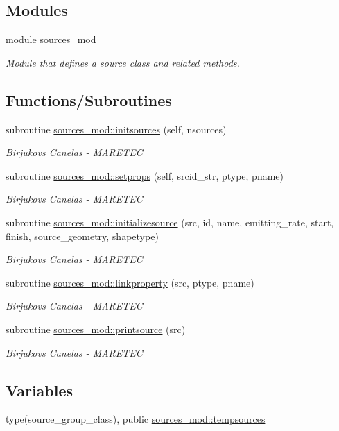 \subsection*{Modules}
\begin{DoxyCompactItemize}
\item 
module \hyperlink{namespacesources__mod}{sources\+\_\+mod}
\begin{DoxyCompactList}\small\item\em Module that defines a source class and related methods. \end{DoxyCompactList}\end{DoxyCompactItemize}
\subsection*{Functions/\+Subroutines}
\begin{DoxyCompactItemize}
\item 
subroutine \hyperlink{namespacesources__mod_a6da3303e5c39d77c0111ec50623bf5fe}{sources\+\_\+mod\+::initsources} (self, nsources)
\begin{DoxyCompactList}\small\item\em Birjukovs Canelas -\/ M\+A\+R\+E\+T\+EC \end{DoxyCompactList}\item 
subroutine \hyperlink{namespacesources__mod_aa02996b7219ce9c9d26439e8d2d0a468}{sources\+\_\+mod\+::setprops} (self, srcid\+\_\+str, ptype, pname)
\begin{DoxyCompactList}\small\item\em Birjukovs Canelas -\/ M\+A\+R\+E\+T\+EC \end{DoxyCompactList}\item 
subroutine \hyperlink{namespacesources__mod_a6dcf7a3e3ccf75e01853df166231d484}{sources\+\_\+mod\+::initializesource} (src, id, name, emitting\+\_\+rate, start, finish, source\+\_\+geometry, shapetype)
\begin{DoxyCompactList}\small\item\em Birjukovs Canelas -\/ M\+A\+R\+E\+T\+EC \end{DoxyCompactList}\item 
subroutine \hyperlink{namespacesources__mod_a683ca7e4aca7a0050aad9f506569fca9}{sources\+\_\+mod\+::linkproperty} (src, ptype, pname)
\begin{DoxyCompactList}\small\item\em Birjukovs Canelas -\/ M\+A\+R\+E\+T\+EC \end{DoxyCompactList}\item 
subroutine \hyperlink{namespacesources__mod_a641fe9ecc295e486a714c1aaa133d991}{sources\+\_\+mod\+::printsource} (src)
\begin{DoxyCompactList}\small\item\em Birjukovs Canelas -\/ M\+A\+R\+E\+T\+EC \end{DoxyCompactList}\end{DoxyCompactItemize}
\subsection*{Variables}
\begin{DoxyCompactItemize}
\item 
type(source\+\_\+group\+\_\+class), public \hyperlink{namespacesources__mod_ab04ea8c02cdf83a1a356c8710ae811d5}{sources\+\_\+mod\+::tempsources}
\end{DoxyCompactItemize}
